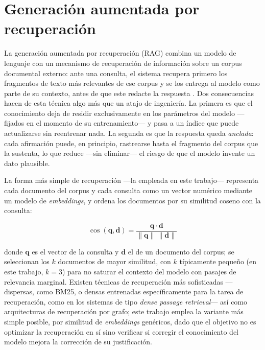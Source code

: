 \section{Generación aumentada por recuperación}\label{sec:rag}

La generación aumentada por recuperación (RAG) combina un modelo de lenguaje con un mecanismo de
recuperación de información sobre un corpus documental externo: ante una consulta, el sistema
recupera primero los fragmentos de texto más relevantes de ese corpus y se los entrega al modelo
como parte de su contexto, antes de que este redacte la respuesta \cite{lewis2020rag}. Dos
consecuencias hacen de esta técnica algo más que un atajo de ingeniería. La primera es que el
conocimiento deja de residir exclusivamente en los parámetros del modelo ---fijados en el momento de
su entrenamiento--- y pasa a un índice que puede actualizarse sin reentrenar nada. La segunda es que
la respuesta queda \emph{anclada}: cada afirmación puede, en principio, rastrearse hasta el
fragmento del corpus que la sustenta, lo que reduce ---sin eliminar--- el riesgo de que el modelo
invente un dato plausible.

La forma más simple de recuperación ---la empleada en este trabajo--- representa cada documento del
corpus y cada consulta como un vector numérico mediante un modelo de \emph{embeddings}, y ordena
los documentos por su similitud coseno con la consulta:

\begin{equation}\label{eq:coseno}
  \cos(\mathbf{q}, \mathbf{d}) = \frac{\mathbf{q} \cdot \mathbf{d}}{\lVert \mathbf{q} \rVert \, \lVert \mathbf{d} \rVert}
\end{equation}

donde $\mathbf{q}$ es el vector de la consulta y $\mathbf{d}$ el de un documento del corpus; se
seleccionan los $k$ documentos de mayor similitud, con $k$ típicamente pequeño (en este trabajo,
$k=3$) para no saturar el contexto del modelo con pasajes de relevancia marginal. Existen técnicas
de recuperación más sofisticadas ---dispersas, como BM25, o densas entrenadas específicamente para la
tarea de recuperación, como en los sistemas de tipo \emph{dense passage retrieval}--- así como
arquitecturas de recuperación por grafo; este trabajo emplea la variante más simple posible, por
similitud de \emph{embeddings} genéricos, dado que el objetivo no es optimizar la recuperación en sí
sino verificar si corregir el conocimiento del modelo mejora la corrección de su justificación.

